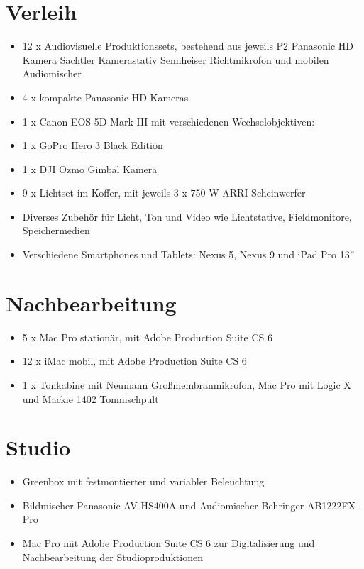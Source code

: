 \section{Verleih}\label{verleih}

\begin{itemize}
\tightlist
\item
  12 x Audiovisuelle Produktionssets, bestehend aus jeweils P2 Panasonic
  HD Kamera Sachtler Kamerastativ Sennheiser Richtmikrofon und mobilen
  Audiomischer
\item
  4 x kompakte Panasonic HD Kameras
\item
  1 x Canon EOS 5D Mark III mit verschiedenen Wechselobjektiven:
\item
  1 x GoPro Hero 3 Black Edition
\item
  1 x DJI Ozmo Gimbal Kamera
\item
  9 x Lichtset im Koffer, mit jeweils 3 x 750 W ARRI Scheinwerfer
\item
  Diverses Zubehör für Licht, Ton und Video wie Lichtstative,
  Fieldmonitore, Speichermedien
\item
  Verschiedene Smartphones und Tablets: Nexus 5, Nexus 9 und iPad Pro
  13''
\end{itemize}

\section{Nachbearbeitung}\label{nachbearbeitung}

\begin{itemize}
\tightlist
\item
  5 x Mac Pro stationär, mit Adobe Production Suite CS 6
\item
  12 x iMac mobil, mit Adobe Production Suite CS 6
\item
  1 x Tonkabine mit Neumann Großmembranmikrofon, Mac Pro mit Logic X und
  Mackie 1402 Tonmischpult
\end{itemize}

\section{Studio}\label{studio}

\begin{itemize}
\tightlist
\item
  Greenbox mit festmontierter und variabler Beleuchtung
\item
  Bildmischer Panasonic AV-HS400A und Audiomischer Behringer
  AB1222FX-Pro
\item
  Mac Pro mit Adobe Production Suite CS 6 zur Digitalisierung und
  Nachbearbeitung der Studioproduktionen
\end{itemize}

